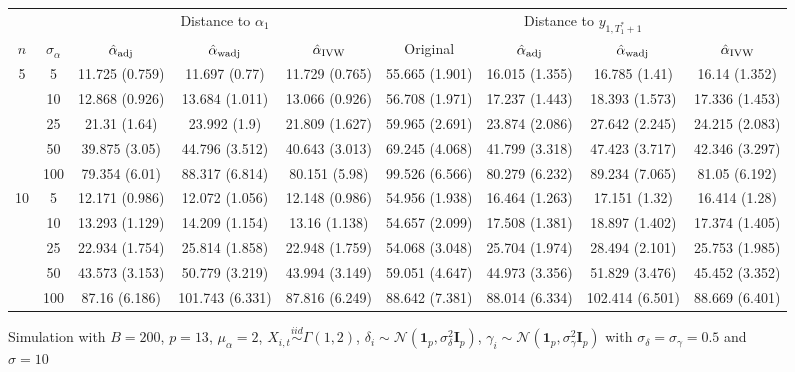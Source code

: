 \documentclass[10pt]{article}
\newcommand{\simiid}{\stackrel{iid}{\sim}} %
\def\normal#1#2{\mathcal{N}(#1,#2)} %
\theoremstyle{definition}
\begin{document}
\begin{sidewaysfigure}
\centering
\caption{Simulation  with $B = 200$, $p = 13$, $\mu_{\alpha}=2$, $X_{i,t} \simiid \Gamma(1,2)$, $\delta_i \sim \normal{\mathbf{1}_p}{\sigma^2_{\delta}\mathbf{I}_p}$, $\gamma_i \sim \normal{\mathbf{1}_p}{\sigma^2_{\gamma}\mathbf{I}_p}$ with $\sigma_{\delta}=\sigma_{\gamma}=0.5$ and $\sigma = 10$}
\begin{tabular}{cc|ccc|cccc}
  & & \multicolumn{3}{c|}{Distance to $\alpha_1$}  & \multicolumn{4}{c}{Distance to $y_{1, T_1^*+1}$}  \\ 
  $n$   & $\sigma_{\alpha}$ & $\hat{\alpha}_{\rm adj}$  & $\hat{\alpha}_{\rm wadj}$ & $\hat{\alpha}_{\rm IVW}$ & Original & $\hat{\alpha}_{\rm adj}$ & $\hat{\alpha}_{\rm wadj}$ & $\hat{\alpha}_{\rm IVW}$\\[.3cm]  
  \hline
 \multirow{5}{*}{5} & 5  & 11.725 (0.759) & 11.697 (0.77) & 11.729 (0.765) & 55.665 (1.901) & 16.015 (1.355) & 16.785 (1.41) & 16.14 (1.352) \\ 
    & 10  & 12.868 (0.926) & 13.684 (1.011) & 13.066 (0.926) & 56.708 (1.971) & 17.237 (1.443) & 18.393 (1.573) & 17.336 (1.453) \\ 
    & 25  & 21.31 (1.64) & 23.992 (1.9) & 21.809 (1.627) & 59.965 (2.691) & 23.874 (2.086) & 27.642 (2.245) & 24.215 (2.083) \\ 
    & 50  & 39.875 (3.05) & 44.796 (3.512) & 40.643 (3.013) & 69.245 (4.068) & 41.799 (3.318) & 47.423 (3.717) & 42.346 (3.297) \\ 
    & 100  & 79.354 (6.01) & 88.317 (6.814) & 80.151 (5.98) & 99.526 (6.566) & 80.279 (6.232) & 89.234 (7.065) & 81.05 (6.192)\\[.3cm]  
   \multirow{5}{*}{10} & 5  & 12.171 (0.986) & 12.072 (1.056) & 12.148 (0.986) & 54.956 (1.938) & 16.464 (1.263) & 17.151 (1.32) & 16.414 (1.28) \\ 
    & 10  & 13.293 (1.129) & 14.209 (1.154) & 13.16 (1.138) & 54.657 (2.099) & 17.508 (1.381) & 18.897 (1.402) & 17.374 (1.405) \\ 
    & 25  & 22.934 (1.754) & 25.814 (1.858) & 22.948 (1.759) & 54.068 (3.048) & 25.704 (1.974) & 28.494 (2.101) & 25.753 (1.985) \\ 
    & 50  & 43.573 (3.153) & 50.779 (3.219) & 43.994 (3.149) & 59.051 (4.647) & 44.973 (3.356) & 51.829 (3.476) & 45.452 (3.352) \\ 
    & 100  & 87.16 (6.186) & 101.743 (6.331) & 87.816 (6.249) & 88.642 (7.381) & 88.014 (6.334) & 102.414 (6.501) & 88.669 (6.401) \\[.3cm]  

\end{tabular}
\end{sidewaysfigure}
\end{document}
